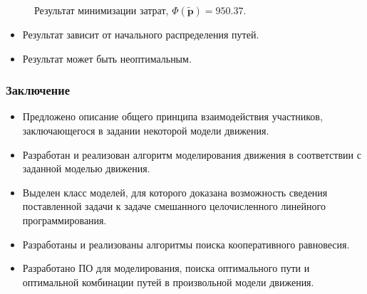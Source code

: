 \documentclass{beamer}
\begin{document}
\begin{frame}
\begin{figure}[H]
\begin{center}
\begin{minipage}[h]{0.35\linewidth}
			\caption{Результат минимизации затрат, $\Phi(\widetilde{\textbf{p}}) = 950.37$.}
		\end{minipage}
	\end{center}
\end{figure}

\begin{itemize}
	\item Результат зависит от начального распределения путей.
	\item Результат может быть неоптимальным.
\end{itemize}

\end{frame}

\begin{frame}\frametitle{Заключение}
	\begin{itemize}
		\item Предложено описание общего принципа взаимодействия участников, заключающегося в задании некоторой модели движения.
		\item Разработан и реализован алгоритм моделирования движения в соответствии с заданной моделью движения.
		\item Выделен класс моделей, для которого доказана возможность сведения поставленной задачи к задаче смешанного целочисленного линейного программирования.
		\item Разработаны и реализованы алгоритмы поиска кооперативного равновесия.
		\item Разработано ПО для моделирования, поиска оптимального пути и оптимальной комбинации путей в произвольной модели движения.
	\end{itemize}
\end{frame}
\end{document}
